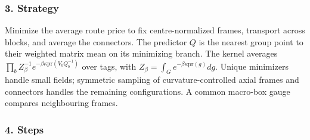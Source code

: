 \documentclass[
  letterpaper,
  11pt]{article}
\begin{document}
\subsubsection{3. Strategy}\label{strategy-3}

Minimize the average route price to fix centre-normalized frames,
transport across blocks, and average the connectors. The predictor \(Q\)
is the nearest group point to their weighted matrix mean on its
minimizing branch. The kernel averages
\(\prod_b Z_\beta^{-1}e^{-\beta\kappa\mathrm{pr}(V_bQ_b^{-1})}\) over
tags, with \(Z_\beta=\int_Ge^{-\beta\kappa\mathrm{pr}(g)}dg\). Unique
minimizers handle small fields; symmetric sampling of
curvature-controlled axial frames and connectors handles the remaining
configurations. A common macro-box gauge compares neighbouring frames.

\subsubsection{4. Steps}\label{steps-3}
\end{document}

